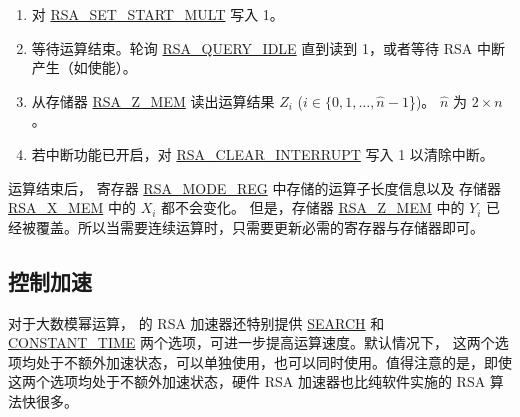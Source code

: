 \documentclass[main\_\_CN.tex]{subfiles}
\begin{document}
\begin{enumerate}
        只需要根据运算子长度，将这两个运算子中有效的数据写入存储器，没有使用到的存储器可以是任意值。

    \item 对 \hyperref[fielddesc:RSASETSTARTMULT]{RSA\_SET\_START\_MULT} 写入 1。

    \item 等待运算结束。轮询 \hyperref[fielddesc:RSAQUERYIDLE]{RSA\_QUERY\_IDLE} 直到读到 1，或者等待 RSA 中断产生（如使能）。

    \item 从存储器 \hyperref[regdesc:RSAmemory]{RSA\_Z\_MEM} 读出运算结果 \begin{math}Z_{i}\end{math} (\begin{math}i \in \{ 0, 1, \dots, \hat{n}-1 \end{math}\})。
        \begin{math}\hat{n}\end{math} 为  \begin{math} 2 \times n \end{math} 。

    \item 若中断功能已开启，对 \hyperref[fielddesc:RSACLEARINTERRUPT]{RSA\_CLEAR\_INTERRUPT} 写入 1 以清除中断。

\end{enumerate}

运算结束后，
寄存器 \hyperref[regdesc:RSAMODEREG]{RSA\_MODE\_REG} 中存储的运算子长度信息以及
存储器 \hyperref[regdesc:RSAmemory]{RSA\_X\_MEM} 中的 \begin{math}{X}_{i}\end{math} 都不会变化。
但是，存储器 \hyperref[regdesc:RSAmemory]{RSA\_Z\_MEM} 中的 \begin{math}{Y}_{i}\end{math}
已经被覆盖。所以当需要连续运算时，只需要更新必需的寄存器与存储器即可。

\subsection{控制加速}\label{sec:Accelerate options}

对于大数模幂运算，\chipname{} 的 RSA 加速器还特别提供 \hyperref[regdesc:RSASEARCHENABLEREG]{SEARCH} 和 \hyperref[regdesc:RSACONSTANTTIMEREG]{CONSTANT\_TIME} 两个选项，可进一步提高运算速度。默认情况下， 这两个选项均处于不额外加速状态，可以单独使用，也可以同时使用。值得注意的是，即使这两个选项均处于不额外加速状态，硬件 RSA 加速器也比纯软件实施的 RSA 算法快很多。
\end{document}
